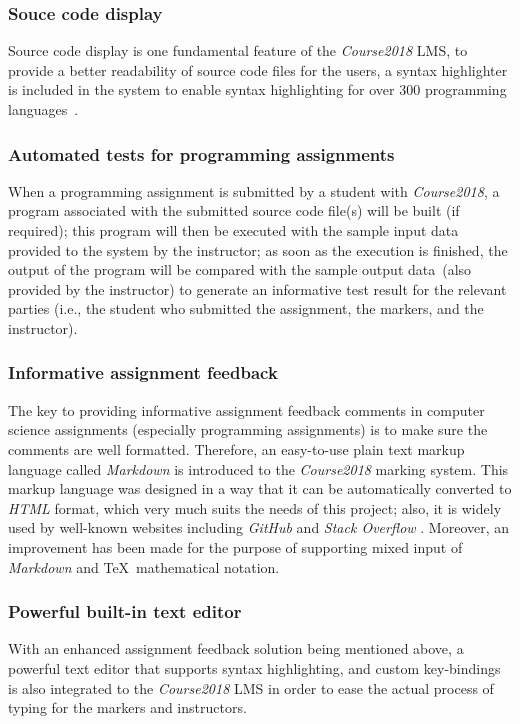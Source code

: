 \subsubsection{Souce code display}
Source code display is one fundamental feature of the \emph{Course2018} LMS,
to provide a better readability of source code files for the users,
a syntax highlighter is included in the system to enable syntax
highlighting \cite{syntaxHighlighting} for over 300 programming
languages~\cite{ApygmentsLangs}.

\subsubsection{Automated tests for programming assignments}
When a programming assignment is submitted by a student with \emph{Course2018},
a program associated with the submitted source code file(s) will be built
(if required); this program
will then be executed with the sample input data provided to the system
by the instructor;
as soon as the execution is finished, 
the output of the program will be compared with the sample output data~(also
provided by the instructor) to
generate an informative test result for the relevant parties (i.e., the student
who submitted the assignment, the markers, and the instructor).

\subsubsection{Informative assignment feedback}
The key to providing informative assignment feedback comments in computer
science assignments (especially programming assignments) is to make sure the
comments are well formatted.
Therefore, an easy-to-use plain text markup language called \emph{Markdown}
is introduced to the \emph{Course2018} marking system. This markup language was
designed in a way that it can be automatically converted to \emph{HTML} format,
which very much suits the needs of this project;
also, it is
widely used by well-known websites including \emph{GitHub} \cite{CgitHubMarkDown}
and \emph{Stack Overflow} \cite{stackOverflowMarkdown}.
Moreover, an improvement has been made for the purpose of supporting mixed
input of \emph{Markdown} and \TeX\ mathematical notation.

\subsubsection{Powerful built-in text editor}
With an enhanced assignment feedback solution being mentioned above, a powerful
text editor that supports syntax highlighting, and custom key-bindings is also
integrated to the \emph{Course2018} LMS in order to ease the actual process of
typing for the markers and instructors.